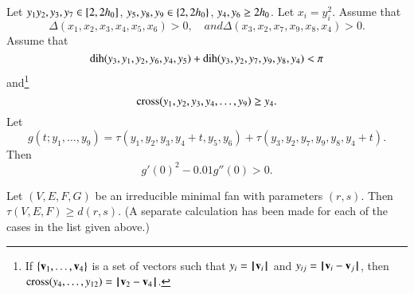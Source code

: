 \begin{calculation}\label{calc:cc:qua}  %
Let $y_1y_2,y_3,y_7\in [ 2,2{h_0}]$,
$y_5,y_8,y_9\in \{2,2{h_0}\}$, $y_4,y_6\ge 2{h_0}$.
Let $x_i = y_i^2$.
Assume that
$$
\Delta(x_1,x_2,x_3,x_4,x_5,x_6)>0,\quad{ and }
\Delta(x_3,x_2,x_7,x_9,x_8,x_4)>0.
$$
Assume that
$$
\operatorname{dih}(y_3,y_1,y_2,y_6,y_4,y_5)+\operatorname{dih}(y_3,y_2,y_7,y_9,y_8,y_4) < \pi
$$
and\footnote{If $\{{\mathbf v}_1,\ldots,{\mathbf v}_4\}$ is a set of vectors such
that $y_i = {{\hskip0.1em|\hskip-0.15em|\hskip0.1em}{\mathbf v}_i{\hskip0.1em|\hskip-0.15em|\hskip0.1em}}$ and $y_{ij} = {\hskip0.1em|\hskip-0.15em|\hskip0.1em}{\mathbf v}_i - {\mathbf v}_j{\hskip0.1em|\hskip-0.15em|\hskip0.1em}$, then ${\operatorname{cross}}(y_4,\ldots,y_{12}) = {\hskip0.1em|\hskip-0.15em|\hskip0.1em}{\mathbf v}_2 - {\mathbf v}_4{\hskip0.1em|\hskip-0.15em|\hskip0.1em}$.}
$$
{\operatorname{cross}}(y_1,y_2,y_3,y_4,\ldots,y_9) \ge y_4.
$$
Let 
$$g(t;y_1,\ldots,y_9) = \tau(y_1,y_2,y_3,y_4+t,y_5,y_6)+\tau(y_3,y_2,y_7,y_9,y_8,y_4+t).$$
Then $$g'(0)^2 - 0.01 g''(0) > 0.$$
\end{calculation}


\begin{calculation}\label{calc:irred} %
Let $(V,E,F,G)$ be an irreducible minimal fan with parameters $(r,s)$.  Then
$\tau(V,E,F) \ge d(r,s)$.
(A separate calculation
has been made for each of the cases in the list given above.)
\end{calculation}










%

